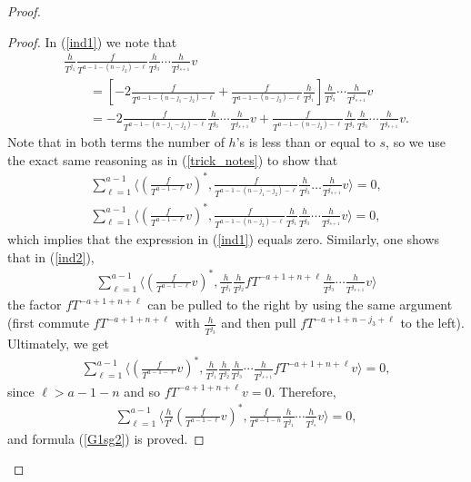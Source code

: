 \begin{proof}
\begin{proof}
In (\ref{ind1}) we note that
\begin{gather*}
\frac{h}{T^{j_1}} \frac{f}{T^{a-1 - (n-j_2) - \ell}} \frac{h}{T^{j_3}} \cdots\frac{h}{T^{j_{s+1}}}v \\
\qquad{} = \left[ -2 \frac{f}{T^{a-1 - (n-j_1-j_2) - \ell}} + \frac{f}{T^{a-1 - (n-j_2) - \ell}}\frac{h}{T^{j_1}} \right] \frac{h}{T^{j_3}} \cdots\frac{h}{T^{j_{s+1}}}v \\
\qquad{} = -2 \frac{f}{T^{a-1 - (n-j_1-j_2) - \ell}} \frac{h}{T^{j_3}} \cdots\frac{h}{T^{j_{s+1}}}v + \frac{f}{T^{a-1 - (n-j_2) - \ell}}\frac{h}{T^{j_1}} \frac{h}{T^{j_3}} \cdots\frac{h}{T^{j_{s+1}}}v.
\end{gather*}
Note that in both terms the number of $h$'s is less than or equal to $s$, so we use the exact same reasoning as in (\ref{trick_notes}) to show that
\begin{gather*}
\sum_{\ell=1}^{a-1} \bigg\langle \left(\frac{f}{T^{a-1-\ell}}v\right)^*, \frac{f}{T^{a-1 - (n-j_1-j_2) - \ell}} \frac{h}{T^{j_3}} \dots\frac{h}{T^{j_{s+1}}}v \bigg\rangle = 0, \\
\sum_{\ell=1}^{a-1} \bigg\langle \left(\frac{f}{T^{a-1-\ell}}v\right)^*, \frac{f}{T^{a-1 - (n-j_2) - \ell}}\frac{h}{T^{j_1}} \frac{h}{T^{j_3}} \cdots\frac{h}{T^{j_{s+1}}}v \bigg\rangle = 0,
\end{gather*}
which implies that the expression in (\ref{ind1}) equals zero. Similarly, one shows that in (\ref{ind2}),
\begin{gather*}
\sum_{\ell=1}^{a-1} \bigg\langle \left(\frac{f}{T^{a-1-\ell}}v\right)^*, \frac{h}{T^{j_1}} \frac{h}{T^{j_2}} fT^{-a+1 + n + \ell} \frac{h}{T^{j_3}} \cdots\frac{h}{T^{j_{s+1}}}v \bigg\rangle
\end{gather*}
the factor $fT^{-a+1 + n + \ell}$ can be pulled to the right by using the same argument (first commute $fT^{-a+1 + n + \ell}$ with $\frac{h}{T^{j_3}}$ and then pull $fT^{-a+1 + n-j_3 + \ell}$ to the left). Ultimately, we get
\begin{gather*}
\sum_{\ell=1}^{a-1} \bigg\langle \left(\frac{f}{T^{a-1-\ell}}v\right)^*, \frac{h}{T^{j_1}} \frac{h}{T^{j_2}} \frac{h}{T^{j_3}} \cdots\frac{h}{T^{j_{s+1}}} fT^{-a+1 + n + \ell} v \bigg\rangle = 0,
\end{gather*}
since $\ell > a-1-n$ and so $fT^{-a+1 + n + \ell} v = 0$. Therefore,
\begin{gather*}
\sum_{\ell=1}^{a-1} \bigg\langle \frac{h}{T^{\ell}} \left(\frac{f}{T^{a-1-\ell}}v\right)^*, \frac{f}{T^{a-1-n}} \frac{h}{T^{j_1}}\cdots\frac{h}{T^{j_{s}}} v \bigg\rangle = 0,
\end{gather*}
and formula (\ref{G1sg2}) is proved.


\end{proof}
\end{proof}
